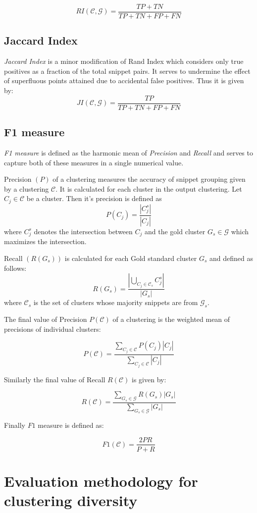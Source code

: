\documentclass[a4paper,12pt]{report}
\begin{document}
$$
RI(\mathcal{C},\mathcal{G}) = \frac{TP + TN}{TP + TN + FP + FN}
$$

\subsection{Jaccard Index}

{\it Jaccard Index} is a minor modification of Rand Index which
considers only true positives as a fraction of the total snippet
pairs. It serves to undermine the effect of superfluous points attained
due to accidental false positives. Thus it is given by:
$$
JI(\mathcal{C},\mathcal{G}) = \frac{TP}{TP + TN + FP + FN}
$$

\subsection{F1 measure}

{\it F1 measure} is defined as the harmonic mean of {\it Precision}
and {\it Recall} and serves to capture both of these measures in a
single numerical value. 

Precision $(P)$ of a clustering measures the accuracy of snippet
grouping given by a clustering $\mathcal{C}$. It is calculated for
each cluster in the output clustering. Let $C_j \in \mathcal{C}$
be a cluster. Then it's precision is defined as
$$
P(C_j) = \frac{|C_j^s|}{|C_j|}
$$ 
where $C_j^s$ denotes the intersection between $C_j$ and the gold
cluster $G_s \in \mathcal{G}$ which maximizes the intersection.

Recall $(R(G_s))$ is calculated for each Gold standard cluster $G_s$ and
defined as follows: 
$$
R(G_s) = \frac{|\bigcup_{C_j \in \mathcal{C}_s}C_j^s|}{|G_s|}
$$ where ${\mathcal{C}_s}$ is the set of clusters whose majority
snippets are from ${\mathcal{G}_s}$.

The final value of Precision $P(\mathcal{C})$ of a clustering is the
weighted mean of precisions of individual clusters:

$$
P(\mathcal{C}) = \frac{\sum_{C_j \in \mathcal{C}}P(C_j)|C_j|}{\sum_{C_j \in \mathcal{C}}|C_j|}
$$

Similarly the final value of Recall $R(\mathcal{C})$ is given by:

$$
R(\mathcal{C}) = \frac{\sum_{G_s \in \mathcal{G}}R(G_s)|G_s|}{\sum_{G_s \in \mathcal{G}}|G_s|}
$$

Finally $F1$ measure is defined as:

$$
F1(\mathcal{C}) = \frac{2PR}{P+R}
$$

\section{Evaluation methodology for clustering diversity}
\end{document}
